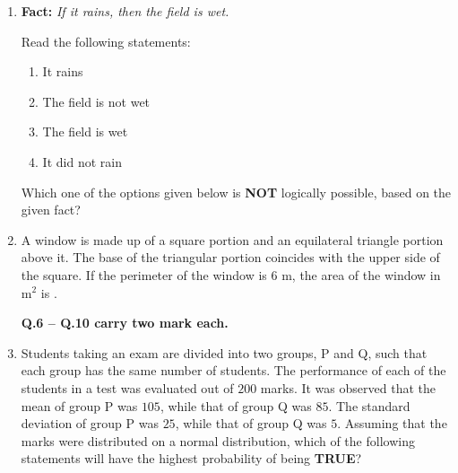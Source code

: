 \documentclass[journal]{IEEEtran}
\begin{document}
\begin{enumerate}[leftmargin=0pt]
  \hfill{}


\item \textbf{Fact:} \textit{If it rains, then the field is wet.}

\vspace{0.5em}

Read the following statements:
\begin{enumerate}[label=(\roman*)]
\item It rains
  \item The field is not wet
  \item The field is wet
  \item It did not rain
\end{enumerate}

Which one of the options given below is \textbf{NOT} logically possible, based on the given fact?

\begin{enumerate}
\end{enumerate}

\hfill{}



\item A window is made up of a square portion and an equilateral triangle portion above it. The base of the triangular portion coincides with the upper side of the square. If the perimeter of the window is $6$ m, the area of the window in m$^2$ is \underline{\hspace{1.5cm}}.
  \begin{enumerate}
  \end{enumerate}

  \hfill{}

\noindent\textbf{Q.6 -- Q.10 carry two mark each.}
\item Students taking an exam are divided into two groups, P and Q, such that each group has the same number of students. The performance of each of the students in a test was evaluated out of $200$ marks. It was observed that the mean of group P was $105$, while that of group Q was $85$. The standard deviation of group P was $25$, while that of group Q was $5$. Assuming that the marks were distributed on a normal distribution, which of the following statements will have the highest probability of being \textbf{TRUE}?


\end{enumerate}
\end{document}
